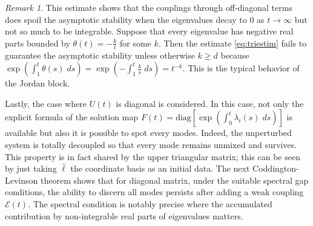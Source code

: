 \documentclass[a4paper,11pt]{article}
\theoremstyle{remark}
\newtheorem{remark}{Remark}[section]
\begin{document}
\begin{remark}
  This estimate shows that the couplings through off-diagonal terms does spoil the asymptotic stability when the eigenvalues decay to $0$ as $t \rightarrow \infty$ but not so much to be integrable. Suppose that every eigenvalue has negative real parts bounded by $\theta(t) = -\frac{k}{t}$ for some $k$. Then the estimate \eqref{eq:triestim} fails to guarantee the asymptotic stability unless otherwise $k\ge d$ because $\exp\left( \int_1^t \theta(s)\;ds\right) =\exp\left( -\int_1^t \frac{k}{s}\;ds\right) =t^{-k}.$ This is the typical behavior of the Jordan block.
\end{remark}

Lastly, the case where $U(t)$ is diagonal is considered. In this case, not only the explicit formula of the solution map $F(t) = \textrm{diag}\left[ \exp\left(\int_0^t \lambda_i(s)\; ds\right) \right]$ is available but also it is possible to spot every modes. Indeed, the unperturbed system is totally decoupled so that every mode remains unmixed and survives. This property is in fact shared by the upper triangular matrix; this can be seen by just taking $\hat{\ell}$ the coordinate basis as an initial data. The next Coddington-Levinson theorem shows that for diagonal matrix, under the suitable spectral gap conditions, the ability to discern all modes persists after adding a weak coupling $\mathcal{E}(t)$. The spectral condition is notably precise where the accumulated contribution by non-integrable real parts of eigenvalues matters.
\end{document}
